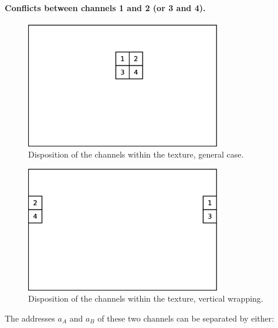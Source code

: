 \documentclass[a4paper,11pt]{kthesis}
\begin{document}
\paragraph{Conflicts between channels 1 and 2 (or 3 and 4).}
\begin{figure}[htp]
\centering
\includegraphics[height=55mm]{chdisp_common.eps}
\caption{Disposition of the channels within the texture, general case.}\label{fig:chdispcommon}
\end{figure}
\begin{figure}[htp]
\centering
\includegraphics[height=55mm]{chdisp_vwrap.eps}
\caption{Disposition of the channels within the texture, vertical wrapping.}\label{fig:chdispvwrap}
\end{figure}
The addresses $a_{A}$ and $a_{B}$ of these two channels can be separated by either:
\end{document}
